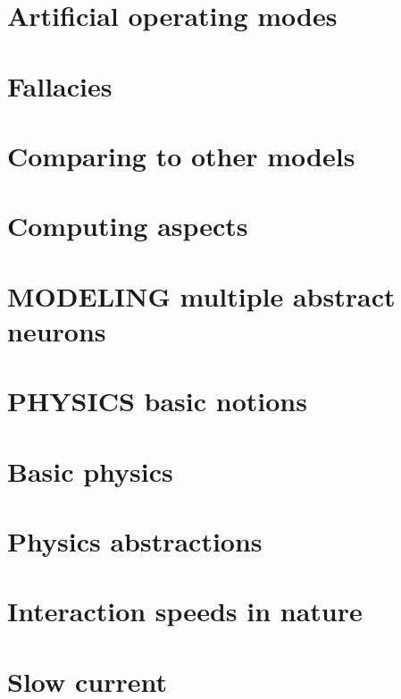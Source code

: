 \let\mypdfximage\pdfximage\def\pdfximage{\immediate\mypdfximage}\documentclass[twoside]{book}
\newcommand{\+}{\discretionary{\mbox{\scriptsize$\hookleftarrow$}}{}{}}
\begin{document}
\chapter{Artificial operating modes}
\label{MODELING_SINGLE_ABSTRACT_ARTIFICIAL_PAGE}

\chapter{Fallacies}
\label{MODELING_SINGLE_FALLACIES_PAGE}

\chapter{Comparing to other models}
\label{MODELING_SINGLE_COMPARING_PAGE}

\chapter{Computing aspects}
\label{MODELING_SINGLE_ABSTRACT_COMPUTING_PAGE}

\chapter{MODELING multiple abstract neurons}
\label{MODELING_MULTIPLE_MAIN_PAGE}

\chapter{PHYSICS basic notions}
\label{PHYSICS_BASICS_NOTIONS_PAGE}

\chapter{Basic physics}
\label{PHYSICS_INTRODUCTORY_PAGE}

\chapter{Physics abstractions}
\label{PHYSICS_ABSTRACTIONS_PAGE}

\chapter{Interaction speeds in nature}
\label{PHYSICS_SPEED_PAGE}

\chapter{Slow current}
\label{PHYSICS_SLOW_CURRENT_PAGE}

\end{document}
